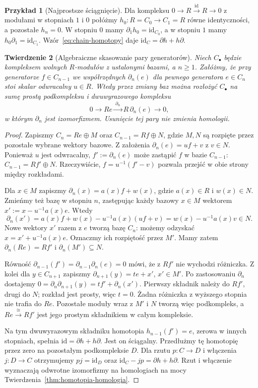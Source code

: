\documentclass[11pt,a4paper,oneside]{report}
\newcommand{\id}{\mathrm{id}}
\theoremstyle{plain}
\newtheorem{twierdzenie}{Twierdzenie}[section]
\theoremstyle{definition}
\newtheorem{przyklad}[twierdzenie]{Przykład}
\theoremstyle{remark}
\begin{document}
\begin{przyklad}[Najprostsze ściągnięcie]
Dla kompleksu
$0\to R\xrightarrow{\id}R\to0$
z modułami w stopniach $1$ i $0$
połóżmy $h_0:R=C_0\to C_1=R$
równe identyczności, a pozostałe
$h_n=0$. W stopniu $0$ mamy
$\partial_1h_0=\id_{C_0}$, a w stopniu
$1$ mamy $h_0\partial_1=\id_{C_1}$.
Wzór~\eqref{eq:chain-homotopy}
daje $\id_C=\partial h+h\partial$.
\end{przyklad}

\begin{twierdzenie}[Algebraiczne skasowanie pary generatorów]
\label{thm:kasowanie-pary}
Niech $C_\bullet$ będzie kompleksem
wolnych $R$-modułów z ustalonymi
bazami, a $n\geq1$. Załóżmy, że
przy generatorze $f\in C_{n-1}$
we współrzędnych $\partial_n(e)$ dla pewnego
generatora $e\in C_n$ stoi skalar
odwracalny $u\in R$.
Wtedy przez zmiany baz można rozłożyć
$C_\bullet$ na sumę prostą
podkompleksu i dwuwyrazowego kompleksu
\[
 0\longrightarrow R e
 \xrightarrow{\ \partial_n\ }R\,\partial_n(e)
 \longrightarrow0,
\]
w którym $\partial_n$ jest izomorfizmem.
Usunięcie tej pary nie zmienia homologii.
\end{twierdzenie}
\begin{proof}
Zapiszmy
$C_n=R e\oplus M$ oraz
$C_{n-1}=R f\oplus N$, gdzie
$M,N$ są rozpięte przez pozostałe
wybrane wektory bazowe.
Z założenia
$\partial_n(e)=u f+v$ z $v\in N$.
Ponieważ $u$ jest odwracalny,
$f':=\partial_n(e)$ może zastąpić $f$
w bazie $C_{n-1}$:
$C_{n-1}=R f'\oplus N$.
Rzeczywiście, $f=u^{-1}(f'-v)$
pozwala przejść w obie strony
między rozkładami.

Dla $x\in M$ zapiszmy
$\partial_n(x)=a(x)f+w(x)$,
gdzie $a(x)\in R$ i $w(x)\in N$.
Zmieńmy też bazę w stopniu $n$,
zastępując każdy bazowy $x\in M$
wektorem $x':=x-u^{-1}a(x)e$.
Wtedy
\[
 \partial_n(x')
 =a(x)f+w(x)-u^{-1}a(x)(uf+v)
 =w(x)-u^{-1}a(x)v\in N.
\]
Nowe wektory $x'$ razem z $e$
tworzą bazę $C_n$: możemy odzyskać
$x=x'+u^{-1}a(x)e$.
Oznaczmy ich rozpiętość przez $M'$.
Mamy zatem $\partial_n(Re)=Rf'$
i $\partial_n(M')\subseteq N$.

Równość $\partial_{n-1}(f')=\partial_{n-1}\partial_n(e)=0$
mówi, że z $Rf'$ nie wychodzi
różniczka. Z kolei dla $y\in C_{n+1}$
zapiszmy $\partial_{n+1}(y)=t e+x'$,
$x'\in M'$. Po zastosowaniu $\partial_n$
dostajemy
$0=\partial_n\partial_{n+1}(y)=t f'+\partial_n(x')$.
Pierwszy składnik należy do $Rf'$,
drugi do $N$; rozkład jest prosty,
więc $t=0$. Żadna różniczka
z wyższego stopnia nie trafia do $Re$.
Pozostałe moduły wraz z $M'$ i $N$
tworzą więc podkompleks, a
$Re\xrightarrow{\cong}Rf'$
jest jego prostym składnikiem
w całym kompleksie.

Na tym dwuwyrazowym składniku
homotopia $h_{n-1}(f')=e$,
zerowa w innych stopniach,
spełnia $\id=\partial h+h\partial$.
Jest on ściągalny. Przedłużmy tę homotopię przez zero na
pozostałym podkompleksie $D$. Dla rzutu $p:C\to D$ i włączenia
$j:D\to C$ otrzymujemy $pj=\id_D$ oraz
$\id_C-jp=\partial h+h\partial$. Rzut i włączenie
wyznaczają odwrotne izomorfizmy
na homologiach na mocy
Twierdzenia~\ref{thm:homotopia-homologia}.
\end{proof}
\end{document}
